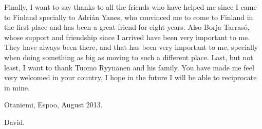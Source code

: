 Finally, I want to say thanks to all the friends who have helped me since I came to Finland specially to Adrián Yanes, who convinced me to come to Finland in the first place and has been a great friend for eight years. Also Borja Tarrasó, whose support and friendship since I arrived have been very important to me. They have always been there, and that has been very important to me, specially when doing something as big as moving to such a different place. Last, but not least, I want to thank Tuomo Ryynänen and his family. You have made me feel very welcomed in your country, I hope in the future I will be able to reciprocate in mine.




\vspace{1cm}
Otaniemi, Espoo, August 2013.

\vspace{0.5cm}
David.
\thispagestyle{plain}
\pagebreak

\tableofcontents

\pagebreak
